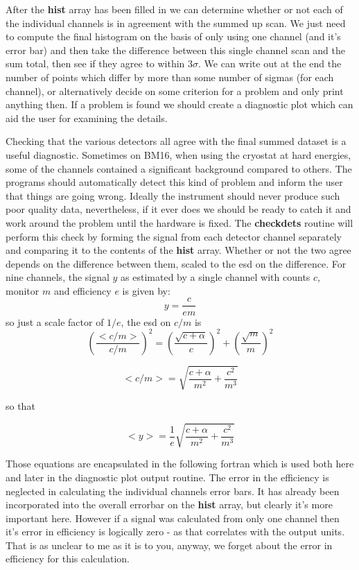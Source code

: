 \documentclass[10pt,a4paper,notitlepage]{article}
\newcommand{\var}[1]{\textbf{\textsf{#1}}} %
\newcommand{\code}[1]{\textbf{\textsf{#1}}} %
\begin{document}
\begin{flushleft}
\begin{minipage}{\linewidth}
\begin{list}{}{\setlength{\itemsep}{-\parsep}\setlength{\itemindent}{-\leftmargin}}
\item{}
\end{list}
\end{minipage}\vspace{4ex}
\end{flushleft}
After the \var{hist} array has been filled in we can determine whether or
not each of the individual channels is in agreement with the summed up
scan.
We just need to compute the final histogram on the basis of only using one
channel (and it's error bar) and then take the difference between this
single channel scan and the sum total, then see if they agree to 
within $3\sigma$. 
We can write out at the end the number of points which differ by more than
some number of sigmas (for each channel), or alternatively decide on some 
criterion for a problem and only print anything then.
If a problem is found we should create a diagnostic plot which can aid the
user for examining the details.

Checking that the various detectors all agree with the final summed
dataset is a useful diagnostic. 
Sometimes on BM16, when using the cryostat at hard energies, some
of the channels contained a significant background compared to
others.
The programs should automatically detect this kind of problem
and inform the user that things are going wrong. 
Ideally the instrument should never produce such poor quality
data, nevertheless, if it ever does we should be ready to
catch it and work around the problem until the hardware is fixed.
The \code{checkdets} routine will perform this check by forming
the signal from each detector channel separately and comparing
it to the contents of the \var{hist} array. 
Whether or not the two agree depends on the difference between
them, scaled to the esd on the difference. 
For nine channels, the signal $y$ as estimated by a single channel
with counts $c$, monitor $m$ and efficiency $e$ is given by:
\[ y = \frac{c}{em} \]
so just a scale factor of $1/e$, the esd on $c/m$ is
\[ \left( \frac{<c/m>}{c/m} \right)^{2} = 
        \left( \frac{ \sqrt{c+\alpha} }{c} \right) ^{2}
       + \left( \frac{ \sqrt{m}}{m} \right)^{2}  \]

\[ <c/m> = \sqrt{ \frac{c+\alpha}{m^{2}} + \frac{c^{2}}{m^{3}} } \]

so that

\[<y>=\frac{1}{e} \sqrt{ \frac{c+\alpha}{m^{2}} + \frac{c^{2}}{m^{3}} }\]

Those equations are encapsulated in the following fortran which is used
both here and later in the diagnostic plot output routine. The
error in the efficiency is neglected in calculating the individual channels 
error bars. It has already been incorporated into the overall errorbar
on the \var{hist} array, but clearly it's more important here. However if a 
signal was calculated from only one channel then it's error in efficiency is
logically zero - as that correlates with the output units. That is as unclear 
to me as it is to you, anyway, we forget about the error in efficiency 
for this calculation.
\end{document}
